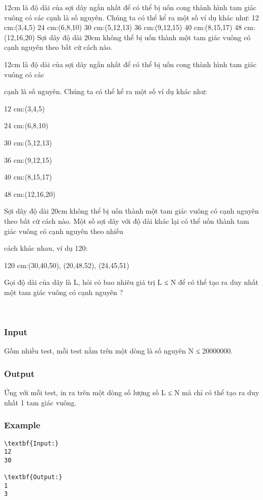 

12cm là độ dài của sợi dây ngắn nhất để có thể bị uốn cong thành hình tam giác vuông có các cạnh là số nguyên. Chúng ta có thể kể ra một số ví dụ khác như: 12 cm:(3,4,5) 24 cm:(6,8,10) 30 cm:(5,12,13) 36 cm:(9,12,15) 40 cm:(8,15,17) 48 cm:(12,16,20) Sợi dây độ dài 20cm không thể bị uốn thành một tam giác vuông có cạnh nguyên theo bất cứ cách nào.

12cm là độ dài của sợi dây ngắn nhất để có thể bị uốn cong thành hình tam giác vuông có các

cạnh là số nguyên. Chúng ta có thể kể ra một số ví dụ khác như:

12 cm:(3,4,5)

24 cm:(6,8,10)

30 cm:(5,12,13)

36 cm:(9,12,15)

40 cm:(8,15,17)

48 cm:(12,16,20)

Sợi dây độ dài 20cm không thể bị uốn thành một tam giác vuông có cạnh nguyên theo bất cứ cách nào. Một số sợi dây với độ dài khác lại có thể uốn thành tam giác vuông có cạnh nguyên theo nhiều

cách khác nhau, ví dụ 120:

120 cm:(30,40,50), (20,48,52), (24,45,51)

Gọi độ dài của dây là L, hỏi có bao nhiêu giá trị L ≤ N để có thể tạo ra duy nhất một tam giác vuông có cạnh nguyên ?

 

\subsubsection{Input}

Gồm nhiều test, mỗi test nằm trên một dòng là số nguyên N ≤ 20000000.

\subsubsection{Output}

Ứng với mỗi test, in ra trên một dòng số lượng số L ≤ N mà chỉ có thể tạo ra duy nhất 1 tam giác vuông.

\subsubsection{Example}
\begin{verbatim}
\textbf{Input:}
12
30

\textbf{Output:}
1
3\end{verbatim}